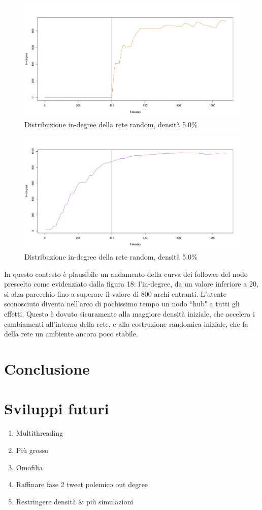\documentclass[a4paper,12pt]{article}
\begin{document}
\begin{figure}[H]
\centering
\includegraphics[scale=0.5]{images/prescelto_1000_rnd_1080_1_1.pdf}
\caption{Distribuzione in-degree della rete random, densità 5.0\%}
\end{figure}
\begin{figure}[H]
\centering
\includegraphics[scale=0.5]{images/gasparri_1000_rnd_1080_1_1.pdf}
\caption{Distribuzione in-degree della rete random, densità 5.0\%}
\end{figure}
In questo contesto è plausibile un andamento della curva dei follower del nodo prescelto come evidenziato dalla figura 18: l'in-degree, da un valore inferiore a 20, si alza parecchio fino a superare il valore di 800 archi entranti. L'utente sconosciuto diventa nell'arco di pochissimo tempo un nodo ``hub" a tutti gli effetti. Questo è dovuto sicuramente alla maggiore densità iniziale, che accelera i cambiamenti all'interno della rete, e alla costruzione randomica iniziale, che fa della rete un ambiente ancora poco stabile.
\section{Conclusione}
\label{sec:end}
\section{Sviluppi futuri}
\label{sec:future}
\begin{enumerate}
\item Multithreading
\item Più grosso
\item Omofilia
\item Raffinare fase 2
	tweet polemico
	out degree
	
\item Restringere densità \& più simulazioni
\end{enumerate}
\end{document}
